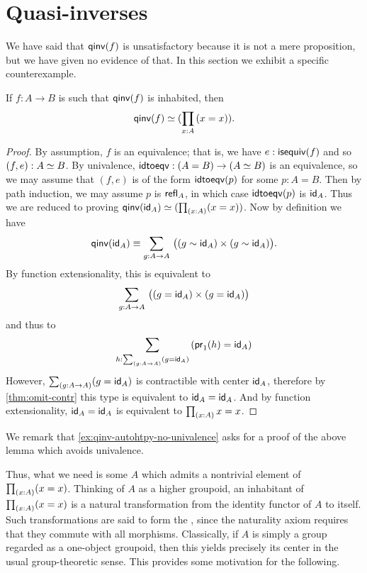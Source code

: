 \section{Quasi-inverses}
\label{sec:quasi-inverses}

We have said that $\qinv(f)$ is unsatisfactory because it is not a mere proposition, but we have given no evidence of that.
In this section we exhibit a specific counterexample.

\begin{lem}\label{lem:qinv-autohtpy}
  If $f:A\to B$ is such that $\qinv (f)$ is inhabited, then
  \[\eqv{\qinv(f)}{(\prd{x:A}(x=x))}.\]
\end{lem}
\begin{proof}
  By assumption, $f$ is an equivalence; that is, we have $e:\isequiv(f)$ and so $(f,e):\eqv A B$.
  By univalence, $\idtoeqv:(A=B) \to (\eqv A B)$ is an equivalence, so we may assume that $(f,e)$ is of the form $\idtoeqv(p)$ for some $p:A=B$.
  Then by path induction, we may assume $p$ is $\refl{A}$, in which case $\idtoeqv(p)$ is $\idfunc[A]$.
  Thus we are reduced to proving $\eqv{\qinv(\idfunc[A])}{(\prd{x:A}(x=x))}$.
  Now by definition we have
  \[ \qinv(\idfunc[A]) \jdeq
  \sm{g:A\to A} \big((g \htpy \idfunc[A]) \times (g \htpy \idfunc[A])\big).
  \]
  By function extensionality, this is equivalent to
  \[ \sm{g:A\to A} \big((g = \idfunc[A]) \times (g = \idfunc[A])\big)
  \]
  and thus to
  \[ \sm{h:\sm{g:A\to A} (g = \idfunc[A])} (\proj1(h) = \idfunc[A])
  \]
  However, $\sm{g:A\to A} (g = \idfunc[A])$ is contractible with center $\idfunc[A]$, therefore by \autoref{thm:omit-contr} this type is equivalent to $\idfunc[A] = \idfunc[A]$.
  And by function extensionality, $\idfunc[A] = \idfunc[A]$ is equivalent to $\prd{x:A} x=x$.
\end{proof}

\noindent
We remark that \autoref{ex:qinv-autohtpy-no-univalence} asks for a proof of the above lemma which avoids univalence.

Thus, what we need is some $A$ which admits a nontrivial element of $\prd{x:A}(x=x)$.
Thinking of $A$ as a higher groupoid, an inhabitant of $\prd{x:A}(x=x)$ is a natural transformation from the identity functor of $A$ to itself.
Such transformations are said to form the ,
%
%
since the naturality axiom requires that they commute with all morphisms.
Classically, if $A$ is simply a group regarded as a one-object groupoid, then this yields precisely its center in the usual group-theoretic sense.
This provides some motivation for the following.

